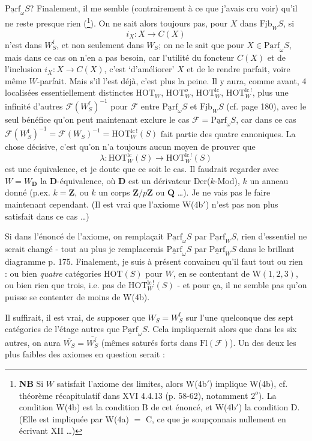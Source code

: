 \documentclass[11pt]{article}
\newcommand{\msp}[1]{\marginpar{\footnotesize [#1]}}
\newcommand{\HOT}{\mathrm{HOT}}
\newcommand{\Fib}{\underline{\mathrm{Fib}}}
\newcommand{\Parf}{\underline{\mathrm{Parf}}}
\begin{document}
$\Parf_\omega S$? Finalement, il me semble (contrairement à ce que j'avais cru voir) qu'il ne reste presque rien (\footnote{\textbf{NB} Si $W$ satisfait l'axiome des limites, alors W(4b$'$) implique W(4b), cf. théorème récapitulatif dans XVI 4.4.13 (p. 58-62), notamment $2^{o}$). La condition W(4b) est la condition B de cet énoncé, et W(4b$'$) la condition D. (Elle est impliquée par W(4a) $=$ C, ce que je soupçonnais nullement en écrivant XII \dots)}). On ne sait alors toujours pas, pour $X$ dans $\Fib_W S$, si
\[ i_X : X \longrightarrow C(X) \]
n'est dans $W^{\mathrm{f}}_S$, et non seulement dans $W_S$; on ne le sait que pour $X \in \Parf_\omega S$, mais dans ce cas on n'en a pas besoin, car l'utilité du foncteur $C(X)$ et de l'inclusion $i_X : X \longrightarrow C(X)$, c'est ‘d'améliorer’ $X$ et de le rendre parfait, voire même $W$-parfait. Mais s'il l'est déjà, c'est plus la peine. Il y aura, comme
\msp{page 184}
avant, 4 localisées essentiellement distinctes $\HOT_W$, $\HOT^{o}_W$, $\HOT^{\mathrm{lc}}_W$, $\HOT^{\mathrm{lc}\,!}_W$, plus une infinité d'autres $\mathcal{F}(W^{\mathrm{f}}_S)^{-1}$ pour $\mathcal{F}$ entre $\Parf_\omega S$ et $\Fib_W S$ (cf. page 180), avec le seul bénéfice qu'on peut maintenant exclure le cas $\mathcal{F} = \Parf_\omega S$, car dans ce cas $\mathcal{F}(W^{\mathrm{f}}_S)^{-1} = \mathcal{F}(W_S)^{-1} = \HOT^{\mathrm{lc}\,!}_W(S)$ fait partie des quatre canoniques. La chose décisive, c'est qu'on n'a toujours aucun moyen de prouver que
\[ \lambda : \HOT^{\mathrm{lc}}_W(S) \longrightarrow \HOT^{\mathrm{lc}\,!}_W(S) \]
est une équivalence, et je doute que ce soit le cas. Il faudrait regarder avec $W = W_{\mathbf{D}}$ la $\mathbf{D}$-équivalence, où $\mathbf{D}$ est un dérivateur Der($k$-Mod), $k$ un anneau donné (p.ex. $k = \mathbf{Z}$, ou $k$ un corps $\mathbf{Z}/p\mathbf{Z}$ ou $\mathbf{Q}$ \dots). Je ne vais pas le faire maintenant cependant. (Il est vrai que l'axiome W(4b$'$) n'est pas non plus satisfait dans ce cas \dots)

Si dans l'énoncé de l'axiome, on remplaçait $\Parf_\omega S$ par $\Parf_W S$, rien d'essentiel ne serait changé - tout au plus je remplacerais $\Parf_\omega S$ par $\Parf_W S$ dans le brillant diagramme p. 175. Finalement, je suis à présent convaincu qu'il faut tout ou rien : ou bien \textit{quatre} catégories $\HOT(S)$ pour $W$, en se contentant de W$(1,2,3)$, ou bien rien que trois, i.e. pas de $\HOT^{\mathrm{lc}\,!}_W(S)$ - et pour ça, il ne semble pas qu'on puisse se contenter de moins de W(4b).

\msp{page 185}
Il suffirait, il est vrai, de supposer que $W_S = W^{\mathrm{f}}_S$ sur l'une quelconque des sept catégories de l'étage autres que $\Parf_\omega S$. Cela impliquerait alors que dans les six autres, on aura $\overline{W_S} = \overline{W^{\mathrm{f}}_S}$ (mêmes saturés forts dans $\mathrm{Fl}(\mathcal{F})$). Un des deux les plus faibles des axiomes en question serait : %
\end{document}
